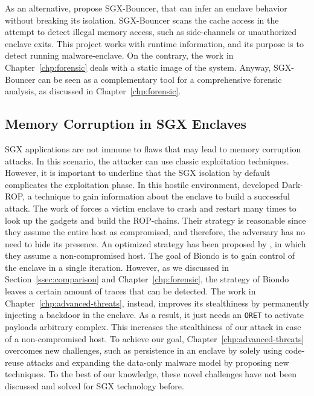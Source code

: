 As an alternative, \cite{zhang2021see} propose SGX-Bouncer, that can infer an 
enclave behavior without breaking its isolation.
SGX-Bouncer scans the cache access in the attempt to detect illegal memory
access, such as side-channels or unauthorized enclave exits.
This project works with runtime information, and its purpose is to detect
running malware-enclave.
On the contrary, the work in Chapter~\ref{chp:forensic} deals with a static 
image of the system. 
Anyway, SGX-Bouncer can be seen as a complementary tool for a comprehensive
forensic analysis, as discussed in Chapter~\ref{chp:forensic}.


\subsection{Memory Corruption in SGX Enclaves}
\label{ssec:memory-corrution}

SGX applications are not immune to flaws that may lead to memory corruption 
attacks.
In this scenario, the attacker can use classic exploitation techniques.
However, it is important to underline that the SGX isolation by default 
complicates the exploitation phase.
In this hostile environment, \cite{lee2017hacking} developed 
Dark-ROP, a technique to gain information about the enclave to build a 
successful attack.
The work of \cite{lee2017hacking} forces a victim enclave to crash
and restart many times to look up the gadgets and build the ROP-chains.
Their strategy is reasonable since they assume the entire host as compromised,
and therefore, the adversary has no need to hide its presence.
An optimized strategy has been proposed by \cite{biondo2018guard}, in which 
they assume a non-compromised host. 
The goal of Biondo is to gain control of the enclave in a single 
iteration.
However, as we discussed in Section~\ref{ssec:comparison} and 
Chapter~\ref{chp:forensic}, the strategy of Biondo leaves a certain amount of 
traces that can be detected.
The work in Chapter~\ref{chp:advanced-threats}, instead, improves its 
stealthiness by permanently injecting a backdoor in the enclave.
As a result, it just needs an \texttt{ORET} to activate payloads 
arbitrary complex.
This increases the stealthiness of our attack in case of a non-compromised 
host.
To achieve our goal, Chapter~\ref{chp:advanced-threats} overcomes new 
challenges, such as persistence in an enclave by solely using code-reuse 
attacks and expanding the data-only malware model by proposing new techniques.
To the best of our knowledge, these novel challenges have not been 
discussed and solved for SGX technology before.

